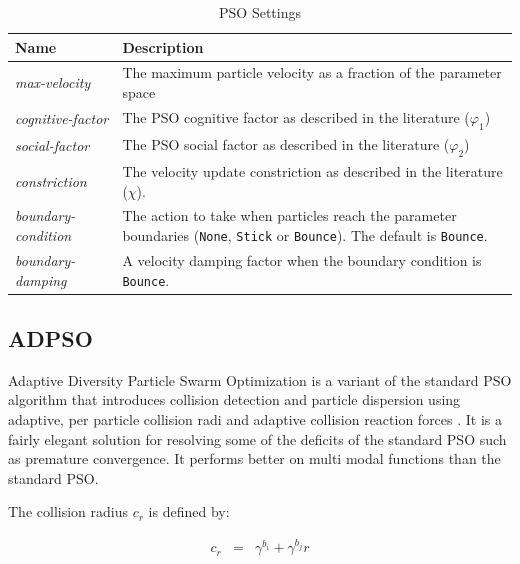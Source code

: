 \documentclass{report}
\begin{document}
\begin{table}[h!tb]\caption{PSO Settings}\label{tab:pso_settings}\vspace{0.1in}
	\centering

	\begin{tabular}{p{4cm} p{12cm}}
		\toprule
		\textbf{Name} & \textbf{Description} \\
		\midrule
		\textit{max-velocity} & The maximum particle velocity as a fraction of
		                        the parameter space \\
		\textit{cognitive-factor} & The PSO cognitive factor as described in the
		                            literature ($\varphi_1$) \\
		\textit{social-factor} & The PSO social factor as described in the
		                         literature ($\varphi_2$) \\
		\textit{constriction} & The velocity update constriction as described
		                        in the literature ($\chi$). \\
		\textit{boundary-condition} & The action to take when particles reach
		                              the parameter boundaries (\verb!None!,
		                              \verb!Stick! or \verb!Bounce!). The
		                              default is \verb!Bounce!. \\
		\textit{boundary-damping} & A velocity damping factor when the boundary
		                            condition is \verb!Bounce!. \\
		\bottomrule
	\end{tabular}
\end{table}

\subsection{ADPSO}
Adaptive Diversity Particle Swarm Optimization is a variant of the standard
PSO algorithm that introduces collision detection and particle dispersion
using adaptive, per particle collision radi and adaptive collision reaction
forces \cite{monson_ad_2006}. It is a fairly elegant solution for resolving
some of the deficits of the standard PSO such as premature convergence. It
performs better on multi modal functions than the standard PSO.

The collision radius $c_r$ is defined by:

\begin{eqnarray*}
	c_r & = & \gamma^{b_i} + \gamma^{b_j} r
\end{eqnarray*}
\end{document}

